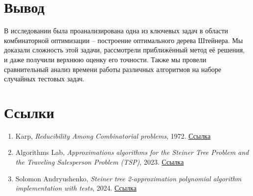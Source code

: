 \documentclass[a4paper,12pt]{article}
\begin{document}
    \vfill \newpage

    \section{Вывод}

    В исследовании была проанализирована одна из ключевых задач в области комбинаторной оптимизации – построение оптимального дерева Штейнера. Мы доказали сложность этой задачи, рассмотрели приближённый метод её решения, и даже получили верхнюю оценку его точности. Также мы провели сравнительный анализ времени работы различных алгоритмов на наборе случайных тестовых задач.

    \section{Ссылки}

    \begin{enumerate}
        \item Karp, \textit{Reducibility Among Combinatorial problems}, 1972. \href{https://cgi.di.uoa.gr/~sgk/teaching/grad/handouts/karp.pdf}{Ссылка}
        
        \item Algorithms Lab, \textit{Approximations algorithms for the Steiner Tree Problem and the Traveling Salesperson Problem (TSP)}, 2023. \href{https://www.youtube.com/watch?v=ZQbq3MAiy6Y}{Ссылка}

        \item Solomon Andryushenko, \textit{Steiner tree 2-approximation polynomial algorithm\\ implementation with tests}, 2024. \href{https://github.com/strangecreator/steiner_tree}{Ссылка}
    \end{enumerate}

\end{document}
